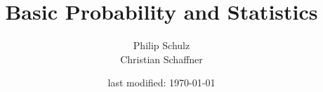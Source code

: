 \documentclass[11pt,leqno,a4paper]{report}
\author{Philip Schulz \\ Christian Schaffner}
\title{Basic Probability and Statistics}
\date{last modified: \today}
\begin{document}
\begin{titlepage}
\maketitle
\end{titlepage}

\tableofcontents
\graphicspath{{../chapter3/}{../chapter5/}{../chapter6/}}

\newpage

\clearpage
\setcounter{page}{1}






\end{document}
